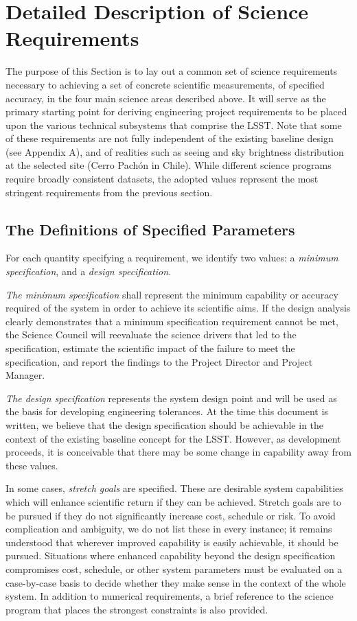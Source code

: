 \newpage
\section{Detailed Description of Science Requirements }

The purpose of this Section is to lay out a common set of science
requirements necessary to achieving a set of concrete scientific measurements,
of specified accuracy, in the four main science areas described above.  It
will serve as the primary starting point for deriving engineering project
requirements to be placed upon the various technical subsystems that
comprise the LSST. Note that some of these requirements are not fully
independent of the existing baseline design (see Appendix A), and of
realities such as seeing and sky brightness distribution at the selected
site (Cerro Pach\'{o}n in Chile). While different science programs
require broadly consistent datasets, the adopted values represent the
most stringent requirements from the previous section.


\subsection{The Definitions of Specified Parameters }

For each quantity specifying a requirement, we identify two values: a
\textit{minimum specification}, and a \textit{design specification.}

\textit{The minimum specification} shall represent the minimum capability
or accuracy required of the system in order to achieve its scientific
aims. If the design analysis clearly demonstrates that a minimum
specification requirement cannot be met, the Science Council will
reevaluate the science drivers that led to the specification, estimate
the scientific impact of the failure to meet the specification, and
report the findings to the Project Director and Project Manager.

\textit{The design specification} represents the system design point and will
be used as the basis for developing engineering tolerances.  At the time
this document is written, we believe that the design specification should
be achievable in the context of the existing baseline concept for the LSST.
However, as development proceeds, it is conceivable that there may be some
change in capability away from these values.

In some cases, \textit{stretch goals} are specified. These are desirable
system capabilities which will enhance scientific return if they can be
achieved. Stretch goals are to be pursued if they do not significantly
increase cost, schedule or risk. To avoid complication and ambiguity, we do
not list these in every instance; it remains understood that wherever
improved capability is easily achievable, it should be pursued.  Situations
where enhanced capability beyond the design specification compromises cost,
schedule, or other system parameters must be evaluated on a case-by-case
basis to decide whether they make sense in the context of the whole system.
In addition to numerical requirements, a brief reference to the science
program that places the strongest constraints is also provided.


